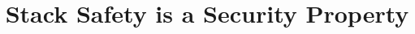\documentclass[acmsmall,review,anonymous]{acmart}\settopmatter{printfolios=true,printccs=false,printacmref=false}
\begin{document}
\title{Stack Safety is a Security Property}         %



%
\end{document}
